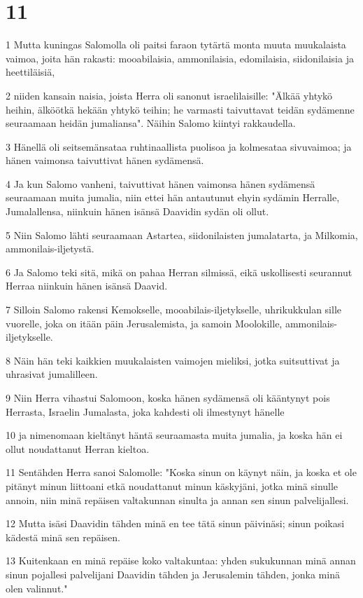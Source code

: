 \chapter{11}

\par 1 Mutta kuningas Salomolla oli paitsi faraon tytärtä monta muuta muukalaista vaimoa, joita hän rakasti: mooabilaisia, ammonilaisia, edomilaisia, siidonilaisia ja heettiläisiä,
\par 2 niiden kansain naisia, joista Herra oli sanonut israelilaisille: "Älkää yhtykö heihin, älköötkä hekään yhtykö teihin; he varmasti taivuttavat teidän sydämenne seuraamaan heidän jumaliansa". Näihin Salomo kiintyi rakkaudella.
\par 3 Hänellä oli seitsemänsataa ruhtinaallista puolisoa ja kolmesataa sivuvaimoa; ja hänen vaimonsa taivuttivat hänen sydämensä.
\par 4 Ja kun Salomo vanheni, taivuttivat hänen vaimonsa hänen sydämensä seuraamaan muita jumalia, niin ettei hän antautunut ehyin sydämin Herralle, Jumalallensa, niinkuin hänen isänsä Daavidin sydän oli ollut.
\par 5 Niin Salomo lähti seuraamaan Astartea, siidonilaisten jumalatarta, ja Milkomia, ammonilais-iljetystä.
\par 6 Ja Salomo teki sitä, mikä on pahaa Herran silmissä, eikä uskollisesti seurannut Herraa niinkuin hänen isänsä Daavid.
\par 7 Silloin Salomo rakensi Kemokselle, mooabilais-iljetykselle, uhrikukkulan sille vuorelle, joka on itään päin Jerusalemista, ja samoin Moolokille, ammonilais-iljetykselle.
\par 8 Näin hän teki kaikkien muukalaisten vaimojen mieliksi, jotka suitsuttivat ja uhrasivat jumalilleen.
\par 9 Niin Herra vihastui Salomoon, koska hänen sydämensä oli kääntynyt pois Herrasta, Israelin Jumalasta, joka kahdesti oli ilmestynyt hänelle
\par 10 ja nimenomaan kieltänyt häntä seuraamasta muita jumalia, ja koska hän ei ollut noudattanut Herran kieltoa.
\par 11 Sentähden Herra sanoi Salomolle: "Koska sinun on käynyt näin, ja koska et ole pitänyt minun liittoani etkä noudattanut minun käskyjäni, jotka minä sinulle annoin, niin minä repäisen valtakunnan sinulta ja annan sen sinun palvelijallesi.
\par 12 Mutta isäsi Daavidin tähden minä en tee tätä sinun päivinäsi; sinun poikasi kädestä minä sen repäisen.
\par 13 Kuitenkaan en minä repäise koko valtakuntaa: yhden sukukunnan minä annan sinun pojallesi palvelijani Daavidin tähden ja Jerusalemin tähden, jonka minä olen valinnut."
